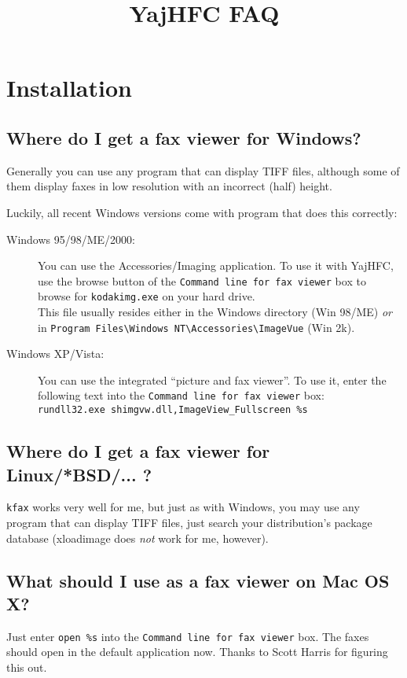 \documentclass[a4paper,10pt]{scrartcl}
\title{YajHFC FAQ}
\author{}
\date{}
\begin{document}
\maketitle

\tableofcontents

\section{Installation}
\subsection{Where do I get a fax viewer for Windows?}

Generally you can use any program that can display TIFF files, although 
some of them display faxes in low resolution with an incorrect (half) height.

Luckily, all recent Windows versions come with program that does this correctly:

\begin{description}
\item[Windows 95/98/ME/2000:]
 You can use the Accessories/Imaging application.
      To use it with YajHFC, use the browse button of the \texttt{Command line for fax viewer}
      box to browse for \texttt{kodakimg.exe} on your hard drive.\\
      This file usually resides either in the Windows directory (Win 98/ME) \emph{or} \\
      in \verb.Program Files\Windows NT\Accessories\ImageVue. (Win 2k).
       
\item[Windows XP/Vista:]
You can use the integrated ``picture and fax viewer''.
      To use it, enter the following text into the \texttt{Command line for fax viewer} box:\\
      \verb#rundll32.exe shimgvw.dll,ImageView_Fullscreen %s#
 \end{description}

      
\subsection{Where do I get a fax viewer for Linux/*BSD/... ?}
\texttt{kfax} works very well for me, but just as with Windows, you may use any program that 
can display TIFF files, just search your distribution's package database 
(xloadimage does \emph{not} work for me, however).


\subsection{What should I use as a fax viewer on Mac OS X?}
Just enter \verb.open %s. into the \texttt{Command line for fax viewer} box.
The faxes should open in the default application now.
Thanks to Scott Harris for figuring this out.
\end{document}
